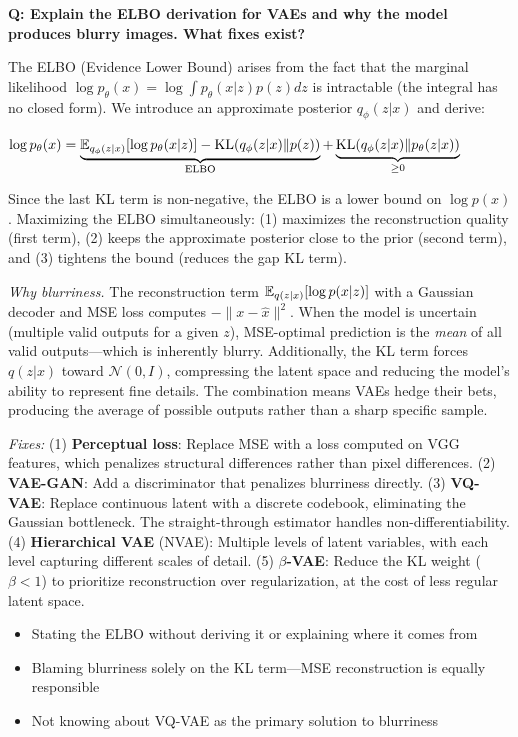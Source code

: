 \begin{interviewq}
\textbf{Q: Explain the ELBO derivation for VAEs and why the model produces blurry images. What fixes exist?}

 \quad {} \quad \badgefreq{\freqhigh}

\stronganswer The ELBO (Evidence Lower Bound) arises from the fact that the marginal likelihood $\log p_\theta(x) = \log \int p_\theta(x|z) p(z) dz$ is intractable (the integral has no closed form). We introduce an approximate posterior $q_\phi(z|x)$ and derive:

$\log p_\theta(x) = \underbrace{\operatorname{\mathbb{E}}_{q_\phi(z|x)}[\log p_\theta(x|z)] - \operatorname{KL}(q_\phi(z|x) \| p(z))}_{\text{ELBO}} + \underbrace{\operatorname{KL}(q_\phi(z|x) \| p_\theta(z|x))}_{\geq 0}$

Since the last KL term is non-negative, the ELBO is a lower bound on $\log p(x)$. Maximizing the ELBO simultaneously: (1) maximizes the reconstruction quality (first term), (2) keeps the approximate posterior close to the prior (second term), and (3) tightens the bound (reduces the gap KL term).

\textit{Why blurriness.} The reconstruction term $\operatorname{\mathbb{E}}_{q(z|x)}[\log p(x|z)]$ with a Gaussian decoder and MSE loss computes $-\|x - \hat{x}\|^2$. When the model is uncertain (multiple valid outputs for a given $z$), MSE-optimal prediction is the \textit{mean} of all valid outputs---which is inherently blurry. Additionally, the KL term forces $q(z|x)$ toward $\mathcal{N}(0, I)$, compressing the latent space and reducing the model's ability to represent fine details. The combination means VAEs hedge their bets, producing the average of possible outputs rather than a sharp specific sample.

\textit{Fixes:} (1) \textbf{Perceptual loss}: Replace MSE with a loss computed on VGG features, which penalizes structural differences rather than pixel differences. (2) \textbf{VAE-GAN}: Add a discriminator that penalizes blurriness directly. (3) \textbf{VQ-VAE}: Replace continuous latent with a discrete codebook, eliminating the Gaussian bottleneck. The straight-through estimator handles non-differentiability. (4) \textbf{Hierarchical VAE} (NVAE): Multiple levels of latent variables, with each level capturing different scales of detail. (5) \textbf{$\beta$-VAE}: Reduce the KL weight ($\beta < 1$) to prioritize reconstruction over regularization, at the cost of less regular latent space.

\redflags
\begin{itemize}
    \item Stating the ELBO without deriving it or explaining where it comes from
    \item Blaming blurriness solely on the KL term---MSE reconstruction is equally responsible
    \item Not knowing about VQ-VAE as the primary solution to blurriness
\end{itemize}


\end{interviewq}
